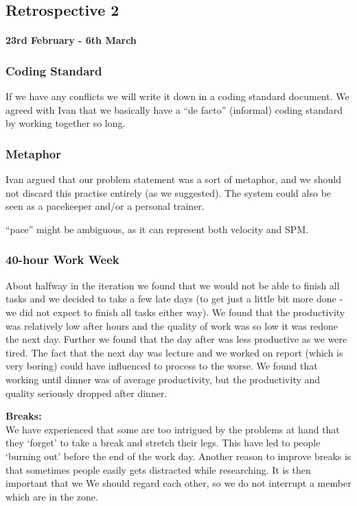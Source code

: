 \subsection*{Retrospective 2}
\paragraph{23rd February - 6th March}

\subsubsection{Coding Standard}
If we have any conflicts we will write it down in a coding standard document. We agreed with Ivan that we basically have a ``de facto'' (informal) coding standard by working together so long.

\subsubsection{Metaphor}
Ivan argued that our problem statement was a sort of metaphor, and we should not discard this practise entirely (as we suggested).
The system could also be seen as a pacekeeper and/or a personal trainer.

``pace'' might be ambiguous, as it can represent both velocity and SPM. 

\subsubsection{40-hour Work Week}
About halfway in the iteration we found that we would not be able to finish all tasks and we decided to take a few late days (to get just a little bit more done - we did not expect to finish all tasks either way).
We found that the productivity was relatively low after hours and the quality of work was so low it was redone the next day. Further we found that the day after was less productive as we were tired. The fact that the next day was lecture and we worked on report (which is very boring) could have influenced to process to the worse.
We found that working until dinner was of average productivity, but the productivity and quality seriously dropped after dinner.

\textbf{Breaks:}\\
We have experienced that some are too intrigued by the problems at hand that they ‘forget' to take a break and stretch their legs. This have led to people ‘burning out' before the end of the work day.
Another reason to improve breaks is that sometimes people easily gets distracted while researching. It is then important that we 
We should regard each other, so we do not interrupt a member which are in the zone.

